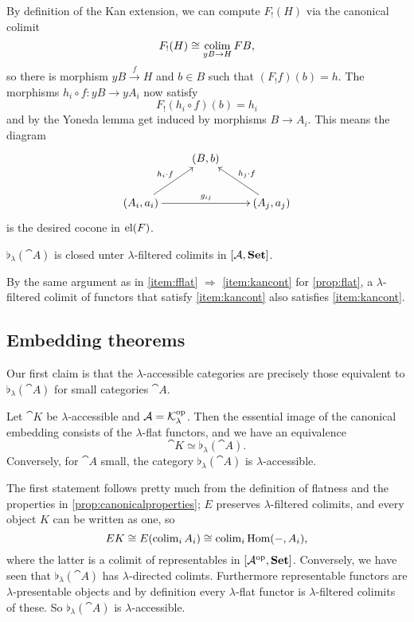 \begin{Proof}
By definition of the Kan extension, we can compute $F_!(H)$ via the canonical colimit 
\[ F_!(H) \cong \operatorname*{colim}_{yB \to H} FB, \]
so there is morphism $yB \xrightarrow{f} H$ and $b \in B$ such that $(F_!f)(b) = h$. The morphisms $h_i\circ f : yB \to yA_i$ now satisfy
\[ F_!(h_i \circ f)(b) = h_i \]
and by the Yoneda lemma get induced by morphisms $B \to A_i$. This means the diagram
\[
\xymatrix{
& (B,b) & \\
(A_i,a_i) \ar[ru]^{h_i \circ f} \ar[rr]^{g_{ij}} & & (A_j,a_j) \ar[lu]_{h_j \circ f} 
}\]
is the desired cocone in $\textrm{el}(F)$.
\end{Proof}

\begin{Corollary}
$\flat_\lambda(\cat A)$ is closed unter $\lambda$-filtered colimits in $[\mathcal{A},\mathbf{Set}]$.
\end{Corollary}
\begin{Proof}
By the same argument as in \ref{item:fflat} $\Rightarrow$ \ref{item:kancont} for \ref{prop:flat}, a $\lambda$-filtered colimit of functors that satisfy \ref{item:kancont} also satisfies \ref{item:kancont}.
\end{Proof}

\subsection{Embedding theorems}

Our first claim is that the $\lambda$-accessible categories are precisely those equivalent to $\flat_\lambda(\cat A)$ for small categories $\cat A$.

\begin{Proposition}
Let $\cat K$ be $\lambda$-accessible and $\mathcal{A} = \mathcal{K}^{\textrm{op}}_\lambda$. Then the essential image of the canonical embedding consists of the $\lambda$-flat functors, and we have an equivalence
\[ \cat K \simeq \flat_\lambda(\cat A). \]
Conversely, for $\cat A$ small, the category $\flat_\lambda(\cat A)$ is $\lambda$-accessible.
\end{Proposition}
\begin{Proof}
The first statement follows pretty much from the definition of flatness and the properties in \ref{prop:canonicalproperties}; $E$ preserves $\lambda$-filtered colimits, and every object $K$ can be written as one, so
\[ EK \cong E(\operatorname{colim}_i A_i) \cong \operatorname{colim}_i \textrm{Hom}(-,A_i), \]
where the latter is a colimit of representables in $[\mathcal{A}^{\textrm{op}},\mathbf{Set}]$.
Conversely, we have seen that $\flat_\lambda(\cat A)$ has $\lambda$-directed colimts. Furthermore representable functors are $\lambda$-presentable objects and by definition every $\lambda$-flat functor is $\lambda$-filtered colimits of these. So $\flat_\lambda(\cat A)$ is $\lambda$-accessible.
\end{Proof}


